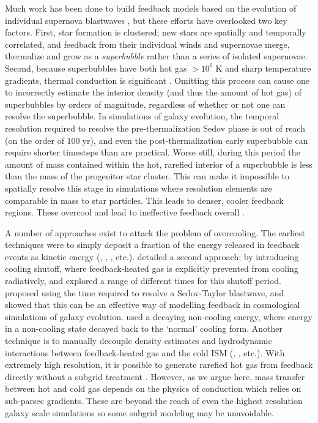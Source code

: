 Much work has been done to build feedback models based on the evolution of
individual supernova blastwaves \citep[e.g.][]{Stinson2006}, but these efforts
have overlooked two key factors.  First, star formation is clustered; new stars
are spatially and temporally correlated, and feedback from their individual
winds and supernovae merge, thermalize and grow as a {\it superbubble} rather
than a series of isolated supernovae.  Second, because superbubbles have both
hot gas $>10^6\;\mathrm{K}$ and sharp temperature gradients, thermal conduction
is significant \citep{Weaver1977}.
Omitting this process can cause one to
incorrectly estimate the interior density (and thus the amount of hot gas) of
superbubbles by orders of magnitude, regardless of whether or not one can
resolve the superbubble.  In simulations of galaxy evolution, the temporal
resolution required to resolve the pre-thermalization Sedov phase is out of
reach (on the order of $100\;\mathrm{yr}$), and even the post-thermalization
early superbubble can require shorter timesteps than are practical. Worse still,
during this period the amount of mass contained within the hot, rarefied
interior of a superbubble is less than the mass of the progenitor star cluster.
This can make it impossible to spatially resolve this stage in simulations where
resolution elements are comparable in mass to star particles.  This leads to
denser, cooler feedback regions.  These overcool and lead to ineffective
feedback overall \citep{Katz1992}.

A number of approaches exist to attack the problem of overcooling.  The earliest
techniques were to simply deposit a fraction of the energy released in feedback
events as kinetic energy (\citet{Navarro1993}, \citet{Mihos1994},
\citet{Dubois2008}, etc.).  \citet{Gerritsen1997} detailed a second approach; by
introducing cooling shutoff, where feedback-heated gas is explicitly prevented
from cooling radiatively, and \citet{Thacker2000} explored a range of different
times for this shutoff period.  \citet{Stinson2006} proposed using the time
required to resolve a Sedov-Taylor blastwave, and showed that this can be an
effective way of modelling feedback in cosmological simulations of galaxy
evolution.  \citet{Agertz2013} used a decaying non-cooling energy, where energy
in a non-cooling state decayed back to the `normal' cooling form. Another
technique is to manually decouple density estimates and hydrodynamic
interactions between feedback-heated gas and the cold ISM (\citet{Marri2003},
\citet{Scannapieco2006}, etc.).  
With extremely high resolution, it
is possible to generate rarefied hot gas from feedback directly without 
a subgrid treatment \citep[e.g.][]{Hopkins2012b}.  
However, as we argue here, mass transfer between hot and cold gas
depends on the physics of conduction which relies on sub-parsec
gradients.  These are beyond the reach of even the highest resolution 
galaxy scale simulations so some subgrid modeling may be unavoidable.

